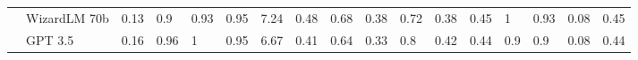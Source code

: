 \begin{table*}[t]
{\begin{tabular}{@{}ll|llll|llll|lll|ll|ll@{}}
                           & WizardLM 70b         & 0.13                                                                    & 0.9                                                                      & 0.93                                                                  & 0.95                                                                  & 7.24                                                                    & 0.48                                                                  & 0.68                                                                  & 0.38                                                                   & 0.72                                                                    & 0.38                                                                  & 0.45                                                                   & 1                                                                      & 0.93                                                                   & 0.08                                                                     & 0.45                                                                     \\
                           & GPT 3.5              & 0.16                                                                    & 0.96                                                                     & 1                                                                     & 0.95                                                                  & 6.67                                                                    & 0.41                                                                  & 0.64                                                                  & 0.33                                                                   & 0.8                                                                     & 0.42                                                                  & 0.44                                                                   & 0.9                                                                    & 0.9                                                                    & 0.08                                                                     & 0.44                                                                     \\

\end{tabular}}
\end{table*}
